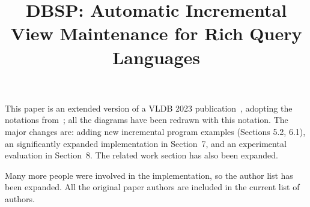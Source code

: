 \documentclass{article}
\begin{document}
\title{DBSP: Automatic Incremental View Maintenance for Rich Query
  Languages}

\maketitle

This paper is an extended version of a VLDB 2023
publication~\cite{budiu-vldb23}, adopting the notations
from~\cite{budiu-sigmod24}; all the diagrams have been redrawn with
this notation.  The major changes are: adding new incremental program
examples (Sections 5.2, 6.1), an significantly expanded implementation
in Section~7, and an experimental evaluation in Section~8.  The
related work section has also been expanded.

Many more people were involved in the implementation, so the author
list has been expanded.  All the original paper authors are included
in the current list of authors.



\end{document}
